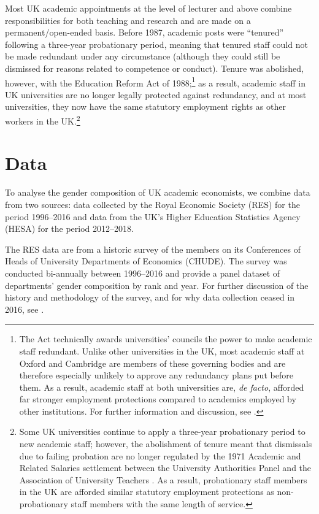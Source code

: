 \documentclass[a4paper, 1]{article}
\begin{document}
Most UK academic appointments at the level of lecturer and above combine responsibilities for both teaching and research and are made on a permanent/open-ended basis. Before 1987, academic posts were ``tenured'' following a three-year probationary period, meaning that tenured staff could not be made redundant under any circumstance (although they could still be dismissed for reasons related to competence or conduct). Tenure was abolished, however, with the Education Reform Act of 1988;\footnote{The Act technically awards universities' councils the power to make academic staff redundant. Unlike other universities in the UK, most academic staff at Oxford and Cambridge are members of these governing bodies and are therefore especially unlikely to approve any redundancy plans put before them. As a result, academic staff at both universities are, \emph{de facto}, afforded far stronger employment protections compared to academics employed by other institutions. For further information and discussion, see \citet{Otsuka2019}.} as a result, academic staff in UK universities are no longer legally protected against redundancy, and at most universities, they now have the same statutory employment rights as other workers in the UK.\footnote{Some UK universities continue to apply a three-year probationary period to new academic staff; however, the abolishment of tenure meant that dismissals due to failing probation are no longer regulated by the 1971 Academic and Related Salaries settlement between the University Authorities Panel and the Association of University Teachers \citep{AUT1974}. As a result, probationary staff members in the UK are afforded similar statutory employment protections as non-probationary staff members with the same length of service.}

\hypertarget{sec:data}{%
\section{Data}\label{sec:data}}

To analyse the gender composition of UK academic economists, we combine data from two sources: data collected by the Royal Economic Society (RES) for the period 1996--2016 and data from the UK's Higher Education Statistics Agency (HESA) for the period 2012--2018.

The RES data are from a historic survey of the members on its Conferences of Heads of University Departments of Economics (CHUDE). The survey was conducted bi-annually between 1996--2016 and provide a panel dataset of departments' gender composition by rank and year. For further discussion of the history and methodology of the survey, and for why data collection ceased in 2016, see \citet{Bateman2021}.
\end{document}
